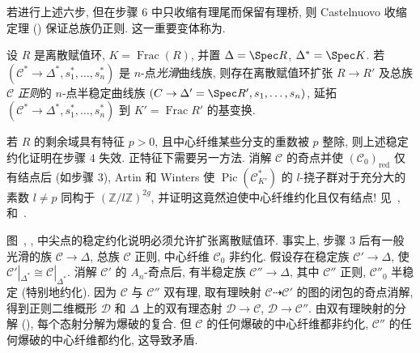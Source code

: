 若进行上述六步, 但在步骤 $6$ 中只收缩有理尾而保留有理桥, 则 Castelnuovo 收缩定理 () 保证总族仍正则. 这一重要变体称为.
\begin{theorem}[半稳定约化]\label{src:6.5.9}
设 $R$ 是离散赋值环, $K=\operatorname{Frac}(R)$, 并置 $\Delta=\Spec R$, $\Delta^*=\Spec K$. 若 $(\mathcal C^*\to\Delta^*,\allowbreak s_1^*,\allowbreak \ldots,\allowbreak s_n^*)$ 是 $n$-点\emph{光滑}曲线族, 则存在离散赋值环扩张 $R\to\allowbreak R'$ 及总族 $\mathcal C$ \emph{正则}的 $n$-点半稳定曲线族 $(\mathcal C\to\Delta'=\Spec R',\allowbreak s_1,\allowbreak \ldots,\allowbreak s_n)$, 延拓 $(\mathcal C^*\to\Delta^*,\allowbreak s_1^*,\allowbreak \ldots,\allowbreak s_n^*)$ 到 $K'=\operatorname{Frac}R'$ 的基变换.
\end{theorem}
\begin{remark}[特征 $p$ 下的证明]\label{src:6.5.10}
若 $R$ 的剩余域具有特征 $p>0$, 且中心纤维某些分支的重数被 $p$ 整除, 则上述稳定约化证明在步骤 $4$ 失效. 正特征下需要另一方法. 消解 $\mathcal C$ 的奇点并使 $(\mathcal C_0)_{\mathrm{red}}$ 仅有结点后 (如步骤 $3$), Artin 和 Winters 使 $\operatorname{Pic}(\mathcal C_{K'}^*)$ 的 $l$-挠子群对于充分大的素数 $l\ne p$ 同构于 $(\mathbb Z/l\mathbb Z)^{2g}$, 并证明这竟然迫使中心纤维约化且仅有结点! 见~\cite{AW71}, \cite[\S10.4]{Liu02} 和~\cite[Tag 0C2P]{SP}.
\end{remark}
\begin{example}[基变换必不可少]\label{src:6.5.11}
图~, ,  中尖点的稳定约化说明必须允许扩张离散赋值环. 事实上, 步骤 $3$ 后有一般光滑的族 $\mathcal C\to\Delta$, 总族 $\mathcal C$ 正则, 中心纤维 $\mathcal C_0$ 非约化. 假设存在稳定族 $\mathcal C'\to\Delta$, 使 $\mathcal C'|_{\Delta^*}\cong\mathcal C|_{\Delta^*}$. 消解 $\mathcal C'$ 的 $A_n$-奇点后, 有半稳定族 $\mathcal C''\to\Delta$, 其中 $\mathcal C''$ 正则, $\mathcal C''_0$ 半稳定 (特别地约化). 因为 $\mathcal C$ 与 $\mathcal C''$ 双有理, 取有理映射 $\mathcal C\dashrightarrow\mathcal C'$ 的图的闭包的奇点消解, 得到正则二维概形 $\mathcal D$ 和 $\Delta$ 上的双有理态射 $\mathcal D\to\mathcal C$, $\mathcal D\to\mathcal C''$. 由双有理映射的分解 (), 每个态射分解为爆破的复合. 但 $\mathcal C$ 的任何爆破的中心纤维都非约化, $\mathcal C''$ 的任何爆破的中心纤维都约化, 这导致矛盾.
\end{example}
